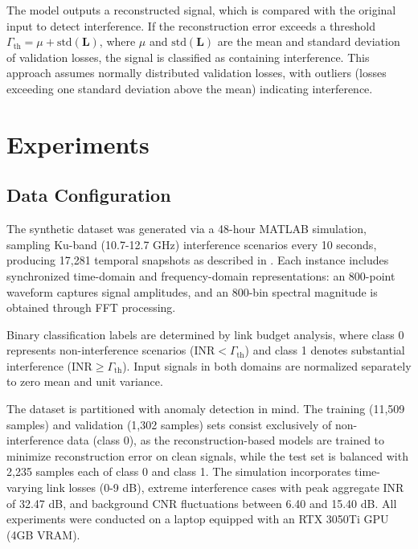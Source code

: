 \documentclass[conference]{IEEEtran}
\begin{document}
The model outputs a reconstructed signal, which is compared with the original input to detect interference. If the reconstruction error exceeds a threshold $\Gamma_{\text{th}} = \mu + \text{std}(\mathbf{L})$, where $\mu$ and $\text{std}(\mathbf{L})$ are the mean and standard deviation of validation losses, the signal is classified as containing interference. This approach assumes normally distributed validation losses, with outliers (losses exceeding one standard deviation above the mean) indicating interference.



\section{Experiments}
\label{sec:experiments}

\subsection{Data Configuration}

The synthetic dataset was generated via a 48-hour MATLAB simulation, sampling Ku-band (10.7-12.7 GHz) interference scenarios every 10 seconds, producing 17,281 temporal snapshots as described in \cite{saifaldawlaGenAIBasedModelsNGSO2024}. Each instance includes synchronized time-domain and frequency-domain representations: an 800-point waveform captures signal amplitudes, and an 800-bin spectral magnitude is obtained through FFT processing.

Binary classification labels are determined by link budget analysis, where class 0 represents non-interference scenarios ($\text{INR} < \Gamma_{\text{th}}$) and class 1 denotes substantial interference ($\text{INR} \geq \Gamma_{\text{th}}$). Input signals in both domains are normalized separately to zero mean and unit variance.

The dataset is partitioned with anomaly detection in mind. The training (11,509 samples) and validation (1,302 samples) sets consist exclusively of non-interference data (class 0), as the reconstruction-based models are trained to minimize reconstruction error on clean signals, while the test set is balanced with 2,235 samples each of class 0 and class 1. The simulation incorporates time-varying link losses (0-9 dB), extreme interference cases with peak aggregate INR of 32.47 dB, and background CNR fluctuations between 6.40 and 15.40 dB. All experiments were conducted on a laptop equipped with an RTX 3050Ti GPU (4GB VRAM).
\end{document}
